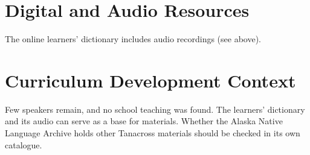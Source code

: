 \documentclass[12pt]{article}
\begin{document}
\section{Digital and Audio Resources}
The online learners' dictionary includes audio recordings (see above).

\section{Curriculum Development Context}
Few speakers remain, and no school teaching was found. The learners' dictionary and its audio can serve as a base for materials. Whether the Alaska Native Language Archive holds other Tanacross materials should be checked in its own catalogue.
\end{document}
